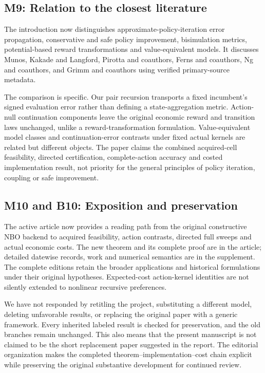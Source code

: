 \hypertarget{m9-relation-to-the-closest-literature}{%
\subsection{M9: Relation to the closest
literature}\label{m9-relation-to-the-closest-literature}}

The introduction now distinguishes approximate-policy-iteration error
propagation, conservative and safe policy improvement, bisimulation
metrics, potential-based reward transformations and value-equivalent
models. It discusses Munos, Kakade and Langford, Pirotta and coauthors,
Ferns and coauthors, Ng and coauthors, and Grimm and coauthors using
verified primary-source metadata.

The comparison is specific. Our pair recursion transports a fixed
incumbent's signed evaluation error rather than defining a
state-aggregation metric. Action-null continuation components leave the
original economic reward and transition laws unchanged, unlike a
reward-transformation formulation. Value-equivalent model classes and
continuation-error contrasts under fixed actual kernels are related but
different objects. The paper claims the combined acquired-cell
feasibility, directed certification, complete-action accuracy and costed
implementation result, not priority for the general principles of policy
iteration, coupling or safe improvement.

\hypertarget{m10-and-b10-exposition-and-preservation}{%
\subsection{M10 and B10: Exposition and
preservation}\label{m10-and-b10-exposition-and-preservation}}

The active article now provides a reading path from the original
constructive NBO backend to acquired feasibility, action contrasts,
directed full sweeps and actual economic costs. The new theorem and its
complete proof are in the article; detailed datewise records, work and
numerical semantics are in the supplement. The complete editions retain
the broader applications and historical formulations under their
original hypotheses. Expected-cost action-kernel identities are not
silently extended to nonlinear recursive preferences.

We have not responded by retitling the project, substituting a different
model, deleting unfavorable results, or replacing the original paper
with a generic framework. Every inherited labeled result is checked for
preservation, and the old branches remain unchanged. This also means
that the present manuscript is not claimed to be the short replacement
paper suggested in the report. The editorial organization makes the
completed theorem--implementation--cost chain explicit while preserving
the original substantive development for continued review.

